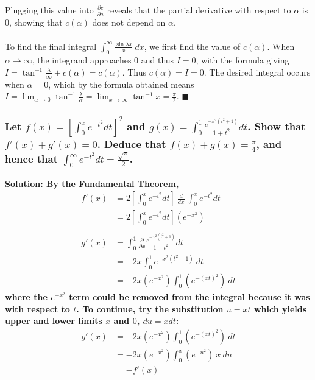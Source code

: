 \documentclass{article}
\begin{document}
Plugging this value into $\frac{\partial c}{\partial a}$ reveals that the partial derivative with respect to $\alpha$ is 0, showing that $c(\alpha)$ does not depend on $\alpha$. \\ \\
To find the final integral $\int_{0}^{\infty} \frac{\sin \lambda x}{x} \ dx$, we first find the value of $c(\alpha)$. When $\alpha \to \infty$, the integrand approaches 0 and thus $I = 0$, with the formula giving $I = \tan^{-1}\frac{\lambda}{\infty} + c(\alpha) = c(\alpha)$. Thus $c(\alpha) = I = 0$. The desired integral occurs when $\alpha = 0$, which by the formula obtained means $I = \lim_{\alpha\to 0} \tan^{-1}\frac{\lambda}{\alpha} = \lim_{x\to\infty} \tan^{-1}x = \frac{\pi}{2}$. $\blacksquare$

\subsubsection*{Let $f(x) = [\int_0^{x} e^{-t^2} dt]^2$ and $g(x) = \int^{1}_{0}\frac{e^{-x^2(t^2+1)}}{1+t^2} dt$. Show that $f'(x) + g'(x) = 0$. Deduce that $f(x)+g(x) = \frac{\pi}{4}$, and hence that $\int_{0}^{\infty} e^{-t^2} dt = \frac{\sqrt{\pi}}{2}$.}
\bf Solution: \normalfont By the Fundamental Theorem,
\begin{equation*}
    \begin{aligned}
        f'(x) &= 2[\int_0^{x} e^{-t^2} dt] \ \frac{d}{dx}\ \int_0^{x} e^{-t^2} dt \\
        &= 2[\int_0^{x} e^{-t^2} dt](e^{-x^2}) \\ \\ 
        g'(x) &= \int_{0}^{1} \frac{\partial}{\partial x} \frac{e^{-x^2(t^2+1)}}{1+t^2} dt \\
        &= -2x\int_{0}^{1} e^{-x^2(t^2+1)}\ dt \\
        &= -2x(e^{-x^2})\int_{0}^{1} (e^{-(xt)^2})\ dt
    \end{aligned}
\end{equation*}
where the $e^{-x^2}$ term could be removed from the integral because it was with respect to $t$. To continue, try the substitution $u = xt$ which yields upper and lower limits $x$ and $0$, $du = x dt$:
\begin{equation*}
    \begin{aligned}
        g'(x) &= -2x(e^{-x^2})\int_{0}^{1} (e^{-(xt)^2})\ dt \\
        &= -2x(e^{-x^2})\int_{0}^{x} (e^{-u^2})\ x\ du \\
        &= -f'(x)
    \end{aligned}
\end{equation*}
\end{document}
